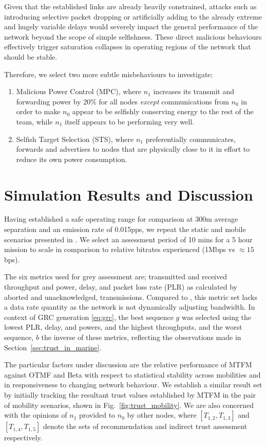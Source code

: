 \documentclass[conference]{IEEEtran}
\begin{document}
Given that the established links are already heavily constrained, attacks such as introducing selective packet dropping or artificially adding to the already extreme and hugely variable delays would severely impact the general performance of the network beyond the scope of simple selfishness.
These direct malicious behaviours effectively trigger saturation collapses in operating regions of the network that should be stable.

Therefore, we select two more subtle misbehaviours to investigate; 
\begin{enumerate}
  \item Malicious Power Control (MPC), where $n_1$ increases its transmit and forwarding power by 20\% for all nodes \emph{except} communications from $n_0$ in order to make $n_0$ appear to be selfishly conserving energy to the rest of the team, while $n_1$ itself appears to be performing very well.
  \item Selfish Target Selection (STS), where $n_1$ preferentially communicates, forwards and advertises to nodes that are physically close to it in effort to reduce its own power consumption.
\end{enumerate}


\section{Simulation Results and Discussion}\label{sec:trustresultsanddiscussion}

Having established a safe operating range for comparison at 300m average separation and an emission rate of 0.015pps, we repeat the static and mobile scenarios presented in \cite{Guo11}. 
We select an assessment period of 10 mins for a 5 hour mission to scale in comparison to relative bitrates experienced (1Mbps vs $\approx15$bps).

The six metrics used for grey assessment are; transmitted and received throughput and power, delay, and packet loss rate (PLR) as calculated by aborted and unacknowledged, transmissions.
Compared to \cite{Guo11}, this metric set lacks a data rate quantity as the network is not dynamically adjusting bandwidth.
In context of GRC generation \eqref{eq:grc}, the best sequence $g$ was selected using the lowest PLR, delay, and powers, and the highest throughputs, and the worst sequence, $b$ the inverse of these metrics, reflecting the observations made in Section~\ref{sec:trust_in_marine}.

The particular factors under discussion are the relative performance of MTFM against OTMF and Beta with respect to statistical stability across mobilities and in responsiveness to changing network behaviour. 
We establish a similar result set by initially tracking the resultant trust values established by MTFM in the pair of mobility scenarios, shown in Fig.~\ref{fig:trust_mobility}.
We are also concerned with the opinions of $n_1$ provided to $n_0$ by other nodes, where $[T_{1,2},T_{1,3}]$ and $[T_{1,4},T_{1,5}]$ denote the sets of recommendation and indirect trust assessment respectively.
\end{document}

